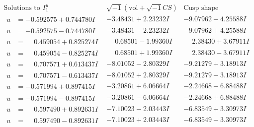 \documentclass[1p]{elsarticle_modified}
\theoremstyle{definition}
\newcommand{\I}{\sqrt{-1}}
\begin{document}
$$\begin{array}{c|c|c}  
\text{Solutions to }I^u_{1}& \I (\text{vol} + \sqrt{-1}CS) & \text{Cusp shape}\\
 \hline 
\begin{aligned}
u &= -0.592575 + 0.744780 I\end{aligned}
 & -3.48431 + 2.23232 I & -9.07962 - 4.25588 I \\ \hline\begin{aligned}
u &= -0.592575 - 0.744780 I\end{aligned}
 & -3.48431 - 2.23232 I & -9.07962 + 4.25588 I \\ \hline\begin{aligned}
u &= \phantom{-}0.459054 + 0.825274 I\end{aligned}
 & \phantom{-}0.68501 - 1.99360 I & \phantom{-}2.38430 + 3.67911 I \\ \hline\begin{aligned}
u &= \phantom{-}0.459054 - 0.825274 I\end{aligned}
 & \phantom{-}0.68501 + 1.99360 I & \phantom{-}2.38430 - 3.67911 I \\ \hline\begin{aligned}
u &= \phantom{-}0.707571 + 0.613437 I\end{aligned}
 & -8.01052 - 2.80329 I & -9.21279 + 3.18913 I \\ \hline\begin{aligned}
u &= \phantom{-}0.707571 - 0.613437 I\end{aligned}
 & -8.01052 + 2.80329 I & -9.21279 - 3.18913 I \\ \hline\begin{aligned}
u &= -0.571994 + 0.897415 I\end{aligned}
 & -3.20861 + 6.06664 I & -2.24668 - 6.88488 I \\ \hline\begin{aligned}
u &= -0.571994 - 0.897415 I\end{aligned}
 & -3.20861 - 6.06664 I & -2.24668 + 6.88488 I \\ \hline\begin{aligned}
u &= \phantom{-}0.597490 + 0.892631 I\end{aligned}
 & -7.10023 - 2.03443 I & -6.83549 + 3.30973 I \\ \hline\begin{aligned}
u &= \phantom{-}0.597490 - 0.892631 I\end{aligned}
 & -7.10023 + 2.03443 I & -6.83549 - 3.30973 I \\ \hline\begin{aligned}

\end{aligned}
\end{array}$$
\end{document}
